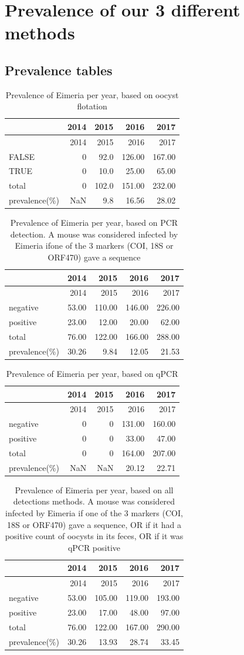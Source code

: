 \documentclass[]{article}
\begin{document}
\section{Prevalence of our 3 different
methods}\label{prevalence-of-our-3-different-methods}

\subsection{Prevalence tables}\label{prevalence-tables}

\begin{longtable}[]{@{}lrrrr@{}}
\caption{Prevalence of Eimeria per year, based on oocyst
flotation}\tabularnewline
\toprule
& 2014 & 2015 & 2016 & 2017\tabularnewline
\midrule
\endfirsthead
\toprule
& 2014 & 2015 & 2016 & 2017\tabularnewline
\midrule
\endhead
FALSE & 0 & 92.0 & 126.00 & 167.00\tabularnewline
TRUE & 0 & 10.0 & 25.00 & 65.00\tabularnewline
total & 0 & 102.0 & 151.00 & 232.00\tabularnewline
prevalence(\%) & NaN & 9.8 & 16.56 & 28.02\tabularnewline
\bottomrule
\end{longtable}

\begin{longtable}[]{@{}lrrrr@{}}
\caption{Prevalence of Eimeria per year, based on PCR detection. A mouse
was considered infected by Eimeria ifone of the 3 markers (COI, 18S or
ORF470) gave a sequence}\tabularnewline
\toprule
& 2014 & 2015 & 2016 & 2017\tabularnewline
\midrule
\endfirsthead
\toprule
& 2014 & 2015 & 2016 & 2017\tabularnewline
\midrule
\endhead
negative & 53.00 & 110.00 & 146.00 & 226.00\tabularnewline
positive & 23.00 & 12.00 & 20.00 & 62.00\tabularnewline
total & 76.00 & 122.00 & 166.00 & 288.00\tabularnewline
prevalence(\%) & 30.26 & 9.84 & 12.05 & 21.53\tabularnewline
\bottomrule
\end{longtable}

\begin{longtable}[]{@{}lrrrr@{}}
\caption{Prevalence of Eimeria per year, based on qPCR}\tabularnewline
\toprule
& 2014 & 2015 & 2016 & 2017\tabularnewline
\midrule
\endfirsthead
\toprule
& 2014 & 2015 & 2016 & 2017\tabularnewline
\midrule
\endhead
negative & 0 & 0 & 131.00 & 160.00\tabularnewline
positive & 0 & 0 & 33.00 & 47.00\tabularnewline
total & 0 & 0 & 164.00 & 207.00\tabularnewline
prevalence(\%) & NaN & NaN & 20.12 & 22.71\tabularnewline
\bottomrule
\end{longtable}

\begin{longtable}[]{@{}lrrrr@{}}
\caption{Prevalence of Eimeria per year, based on all detections
methods. A mouse was considered infected by Eimeria if one of the 3
markers (COI, 18S or ORF470) gave a sequence, OR if it had a positive
count of oocysts in its feces, OR if it was qPCR
positive}\tabularnewline
\toprule
& 2014 & 2015 & 2016 & 2017\tabularnewline
\midrule
\endfirsthead
\toprule
& 2014 & 2015 & 2016 & 2017\tabularnewline
\midrule
\endhead
negative & 53.00 & 105.00 & 119.00 & 193.00\tabularnewline
positive & 23.00 & 17.00 & 48.00 & 97.00\tabularnewline
total & 76.00 & 122.00 & 167.00 & 290.00\tabularnewline
prevalence(\%) & 30.26 & 13.93 & 28.74 & 33.45\tabularnewline
\bottomrule
\end{longtable}
\end{document}
